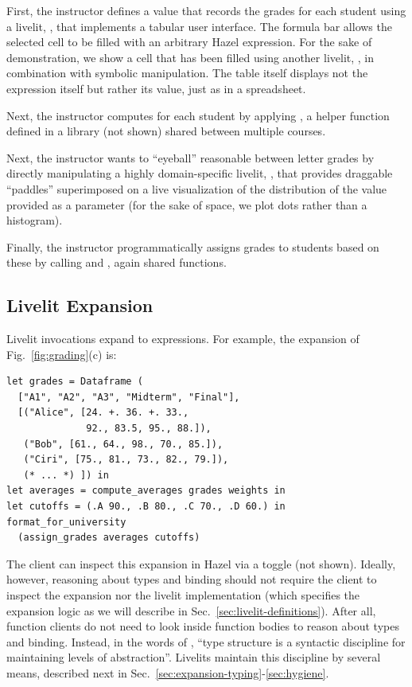 First, the instructor defines a value  
that records the grades for each student using a livelit, , 
that implements a tabular user interface. The formula bar 
allows the selected cell to be filled with an arbitrary Hazel expression. 
For the sake of demonstration, we show a cell that has been filled using another livelit, 
, in combination with symbolic manipulation.
The table itself displays not the expression itself but rather its value, just as in a spreadsheet.

Next, the instructor computes  
for each student by applying , a helper function 
defined in a library  (not shown) shared between multiple courses.

Next, the instructor wants to ``eyeball'' reasonable  between letter grades 
by directly manipulating a highly domain-specific livelit, , that provides draggable ``paddles'' 
superimposed on a live visualization of the distribution of the  value provided as a parameter 
(for the sake of space, we plot dots rather than a histogram).

Finally, 
the instructor programmatically assigns grades to students 
based on these  
by calling  
and ,
again shared functions.

\subsection{Livelit Expansion}\label{sec:livelit-expansion}
Livelit invocations 
expand to expressions.
For example, the expansion of Fig.~\ref{fig:grading}(c) is:

\begin{lstlisting}[xleftmargin=0.2cm]
let grades = Dataframe (
  ["A1", "A2", "A3", "Midterm", "Final"],
  [("Alice", [24. +. 36. +. 33., 
              92., 83.5, 95., 88.]),
   ("Bob", [61., 64., 98., 70., 85.]),
   ("Ciri", [75., 81., 73., 82., 79.]),
   (* ... *) ]) in
let averages = compute_averages grades weights in
let cutoffs = (.A 90., .B 80., .C 70., .D 60.) in
format_for_university 
  (assign_grades averages cutoffs)
\end{lstlisting}

The client can inspect this expansion in Hazel via a toggle (not shown).
Ideally, however, reasoning about types and binding
should not require the client to inspect the expansion 
nor the livelit implementation (which specifies the expansion logic 
as we will describe in Sec.~\ref{sec:livelit-definitions}).
After all, function clients do not need to look inside
function bodies to reason about types and binding.
Instead, in the words of \citet{DBLP:conf/ifip/Reynolds83},
``type structure is a syntactic discipline for maintaining levels of abstraction''.
Livelits maintain this discipline by
several means, described next in Sec.~\ref{sec:expansion-typing}-\ref{sec:hygiene}.

